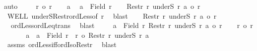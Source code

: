 \begin{isabellebody}
%
\isadelimproof
%
\endisadelimproof
%
\isatagproof
{}\isamarkupfalse%
{\isacharparenleft}{\kern0pt}auto{\isacharparenright}{\kern0pt}\isanewline
\ \ \isamarkupfalse%
\ {\isacharasterisk}{\kern0pt}{\isacharcolon}{\kern0pt}\ {\isachardoublequoteopen}r\ {\isasymle}o\ r{\isacharprime}{\kern0pt}{\isachardoublequoteclose}\isanewline
\ \ \isamarkupfalse%
\ a\ \isamarkupfalse%
\ {\isachardoublequoteopen}a\ {\isasymin}\ Field\ r{\isachardoublequoteclose}\isanewline
\ \ \isamarkupfalse%
\ {\isachardoublequoteopen}Restr\ r\ {\isacharparenleft}{\kern0pt}underS\ r\ a{\isacharparenright}{\kern0pt}\ {\isacharless}{\kern0pt}o\ r{\isachardoublequoteclose}\isanewline
\ \ \isamarkupfalse%
\ WELL\ underS{\isacharunderscore}{\kern0pt}Restr{\isacharunderscore}{\kern0pt}ordLess{\isacharbrackleft}{\kern0pt}of\ r{\isacharbrackright}{\kern0pt}\ \isamarkupfalse%
\ blast\isanewline
\ \ \isamarkupfalse%
\ {\isachardoublequoteopen}Restr\ r\ {\isacharparenleft}{\kern0pt}underS\ r\ a{\isacharparenright}{\kern0pt}\ {\isacharless}{\kern0pt}o\ r{\isacharprime}{\kern0pt}{\isachardoublequoteclose}\isanewline
\ \ \isamarkupfalse%
\ {\isacharasterisk}{\kern0pt}\ ordLess{\isacharunderscore}{\kern0pt}ordLeq{\isacharunderscore}{\kern0pt}trans\ \isamarkupfalse%
\ blast\isanewline
{}\isamarkupfalse%
\isanewline
\ \ \isamarkupfalse%
\ {\isacharasterisk}{\kern0pt}{\isacharcolon}{\kern0pt}\ {\isachardoublequoteopen}{\isasymforall}a\ {\isasymin}\ Field\ r{\isachardot}{\kern0pt}\ Restr\ r\ {\isacharparenleft}{\kern0pt}underS\ r\ a{\isacharparenright}{\kern0pt}\ {\isacharless}{\kern0pt}o\ r{\isacharprime}{\kern0pt}{\isachardoublequoteclose}\isanewline
\ \ \isacommand{{\isacharbraceleft}{\kern0pt}}\isamarkupfalse%
\isamarkupfalse%
\ {\isachardoublequoteopen}r{\isacharprime}{\kern0pt}\ {\isacharless}{\kern0pt}o\ r{\isachardoublequoteclose}\isanewline
\ \ \ \isamarkupfalse%
\ \isamarkupfalse%
\ a\ \ {\isachardoublequoteopen}a\ {\isasymin}\ Field\ r\ {\isasymand}\ r{\isacharprime}{\kern0pt}\ {\isacharequal}{\kern0pt}o\ Restr\ r\ {\isacharparenleft}{\kern0pt}underS\ r\ a{\isacharparenright}{\kern0pt}{\isachardoublequoteclose}\isanewline
\ \ \ \isamarkupfalse%
\ assms\ ordLess{\isacharunderscore}{\kern0pt}iff{\isacharunderscore}{\kern0pt}ordIso{\isacharunderscore}{\kern0pt}Restr\ \isamarkupfalse%
\ blast\isanewline

\end{isabellebody}
